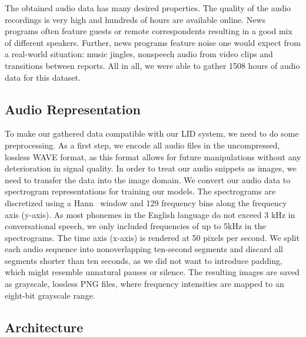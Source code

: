 \documentclass{llncs}
\begin{document}
The obtained audio data has many desired properties.
The quality of the audio recordings is very high and hundreds of hours are available online.
News programs often feature guests or remote correspondents resulting in a good mix of different speakers.
Further, news programs feature noise one would expect from a real-world situation: music jingles, nonspeech audio from video clips and transitions between reports.
All in all, we were able to gather 1508 hours of audio data for this dataset.

\subsection{Audio Representation}
\label{subsec:audio_representation}

To make our gathered data compatible with our \ac{LID} system, we need to do some preprocessing.
As a first step, we encode all audio files in the uncompressed, lossless WAVE format, as this format allows for future manipulations without any deterioration in signal quality.
In order to treat our audio snippets as images, we need to transfer the data into the image domain.
We convert our audio data to spectrogram representations for training our models.
The spectrograms are discretized using a Hann~\cite{Blackman1958Measurement} window and 129 frequency bins along the frequency axis (y-axis).
As most phonemes in the English language do not exceed 3 kHz in conversational speech, we only included frequencies of up to 5kHz in the spectrograms.
The time axis (x-axis) is rendered at 50 pixels per second.
We split each audio sequence into nonoverlapping ten-second segments and discard all segments shorter than ten seconds, as we did not want to introduce padding, which might resemble unnatural pauses or silence.
The resulting images are saved as grayscale, lossless  PNG files, where frequency intensities are mapped to an eight-bit grayscale range.

\subsection{Architecture}
\label{subsec:architecure}
\end{document}
